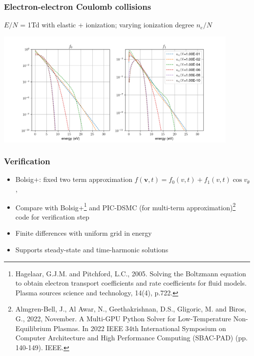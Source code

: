 \documentclass[mathserif, aspectratio=169]{beamer}
\newcommand{\vect}[1]{\boldsymbol{#1}}
\begin{document}
\begin{frame}
	\frametitle{Electron-electron Coulomb collisions}
	$E/N$ = 1Td with elastic + ionization; varying ionization degree $n_e/N$
	\vspace*{-0.08in}
	\begin{center}
		\includegraphics[width=0.9\textwidth]{1Td_cc.png}
	\end{center}
\end{frame}

\begin{frame}
	\frametitle{Verification}
	\begin{itemize}
		\item Bolsig+: fixed two term approximation $f(\vect{v},t) = f_0(v, t) + f_1(v,t)\cos v_\theta$, %
		\item Compare with Bolsig+\footnote[frame]{Hagelaar, G.J.M. and Pitchford, L.C., 2005. Solving the Boltzmann equation to obtain electron transport coefficients and rate coefficients for fluid models. Plasma sources science and technology, 14(4), p.722.} and PIC-DSMC (for multi-term approximation)\footnote[frame]{Almgren-Bell, J., Al Awar, N., Geethakrishnan, D.S., Gligoric, M. and Biros, G., 2022, November. A Multi-GPU Python Solver for Low-Temperature Non-Equilibrium Plasmas. In 2022 IEEE 34th International Symposium on Computer Architecture and High Performance Computing (SBAC-PAD) (pp. 140-149). IEEE.} code for verification step 
		\item Finite differences with uniform grid in energy
		\item Supports steady-state and time-harmonic solutions
	\end{itemize}
\end{frame}
\end{document}
